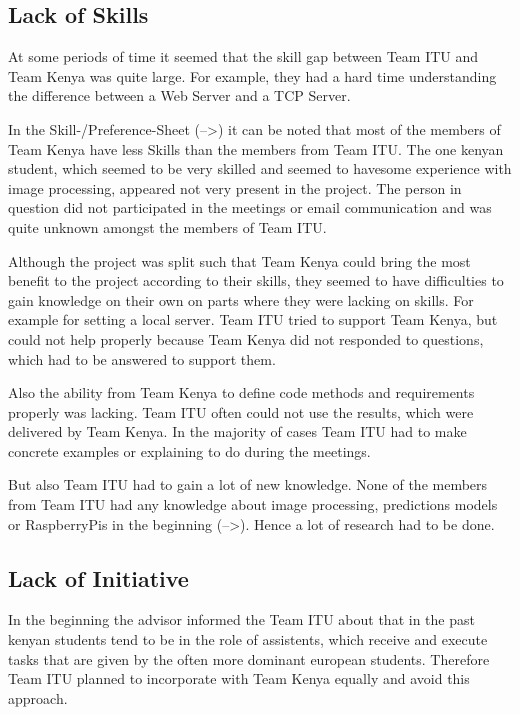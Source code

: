 
\subsection{Lack of Skills}
At some periods of time it seemed that the skill gap between Team ITU and Team Kenya was quite large. For example, they had a hard time understanding the difference between a Web Server and a TCP Server.

In the Skill-/Preference-Sheet (-->) it can be noted that most of the members of Team Kenya have less Skills than the members from Team ITU. The one kenyan student, which seemed to be very skilled and seemed to havesome experience with image processing, appeared not very present in the project. The person in question did not participated in the meetings or email communication and was quite unknown amongst the members of Team ITU.

Although the project was split such that Team Kenya could bring the most benefit to the project according to their skills, they seemed to have difficulties to gain knowledge on their own on parts where they were lacking on skills. For example for setting a local server. Team ITU tried to support Team Kenya, but could not help properly because Team Kenya did not responded to questions, which had to be answered to support them. 

Also the ability from Team Kenya to define code methods and requirements properly was lacking. Team ITU often could not use the results, which were delivered by Team Kenya. In the majority of cases Team ITU had to make concrete examples or explaining to do during the meetings.

But also Team ITU had to gain a lot of new knowledge. None of the members from Team ITU had any knowledge about image processing, predictions models or RaspberryPis in the beginning  (-->). Hence a lot of research had to be done. 


\subsection{Lack of Initiative}
In the beginning the advisor informed the Team ITU about that in the past kenyan students tend to be in the role of assistents, which receive and execute tasks that are given by the often more dominant european students. Therefore Team ITU planned to incorporate with Team Kenya equally and avoid this approach.

